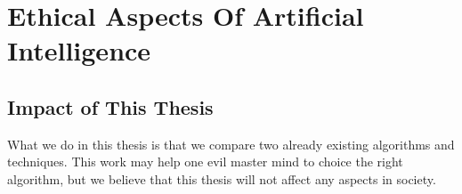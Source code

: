 \section{Ethical Aspects Of Artificial Intelligence }



\subsection{Impact of This Thesis }
What we do in this thesis is that we compare two already existing algorithms and techniques. This work may help one evil master mind to choice the right algorithm, but we believe that this thesis will not affect any  aspects in society. 





